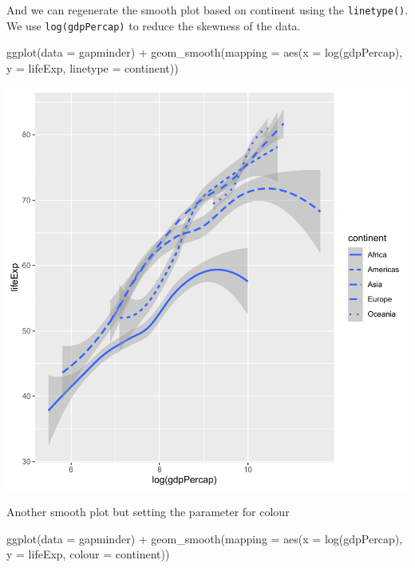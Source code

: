 \documentclass[
]{book}
\makeatletter
\newenvironment{Shaded}{\begin{snugshade}}{\end{snugshade}}
\newcommand{\AttributeTok}[1]{\textcolor[rgb]{0.61,0.61,0.61}{#1}}
\newcommand{\FunctionTok}[1]{\textcolor[rgb]{0,0,0}{#1}}
\newcommand{\NormalTok}[1]{#1}
\newcommand{\SpecialCharTok}[1]{\textcolor[rgb]{0,0,0}{#1}}
\newenvironment{kframe}{%
\medskip{}
\setlength{\fboxsep}{.8em}
 \def\at@end@of@kframe{}%
 \ifinner\ifhmode%
  \def\at@end@of@kframe{\end{minipage}}%
  \begin{minipage}{\columnwidth}%
 \fi\fi%
 \def\FrameCommand##1{\hskip\@totalleftmargin \hskip-\fboxsep
 \colorbox{shadecolor}{##1}\hskip-\fboxsep
     \hskip-\linewidth \hskip-\@totalleftmargin \hskip\columnwidth}%
 \MakeFramed {\advance\hsize-\width
   \@totalleftmargin\z@ \linewidth\hsize
   \@setminipage}}%
 {\par\unskip\endMakeFramed%
 \at@end@of@kframe}
\renewenvironment{Shaded}{\begin{kframe}}{\end{kframe}}
\makeatother
\begin{document}
And we can regenerate the smooth plot based on continent using the \texttt{linetype()}. We use \texttt{log(gdpPercap)} to reduce the skewness of the data.

\begin{Shaded}
\begin{Highlighting}[]
\FunctionTok{ggplot}\NormalTok{(}\AttributeTok{data =}\NormalTok{ gapminder) }\SpecialCharTok{+}
  \FunctionTok{geom\_smooth}\NormalTok{(}\AttributeTok{mapping =} \FunctionTok{aes}\NormalTok{(}\AttributeTok{x =} \FunctionTok{log}\NormalTok{(gdpPercap), }\AttributeTok{y =}\NormalTok{ lifeExp, }\AttributeTok{linetype =}\NormalTok{ continent))}
\end{Highlighting}
\end{Shaded}

\begin{center}\includegraphics[width=0.7\linewidth,keepaspectratio]{Multivariable_Data_Analysis_files/figure-latex/unnamed-chunk-27-1} \end{center}

Another smooth plot but setting the parameter for colour

\begin{Shaded}
\begin{Highlighting}[]
\FunctionTok{ggplot}\NormalTok{(}\AttributeTok{data =}\NormalTok{ gapminder) }\SpecialCharTok{+}
  \FunctionTok{geom\_smooth}\NormalTok{(}\AttributeTok{mapping =} \FunctionTok{aes}\NormalTok{(}\AttributeTok{x =} \FunctionTok{log}\NormalTok{(gdpPercap), }\AttributeTok{y =}\NormalTok{ lifeExp, }\AttributeTok{colour =}\NormalTok{ continent))}
\end{Highlighting}
\end{Shaded}
\end{document}
